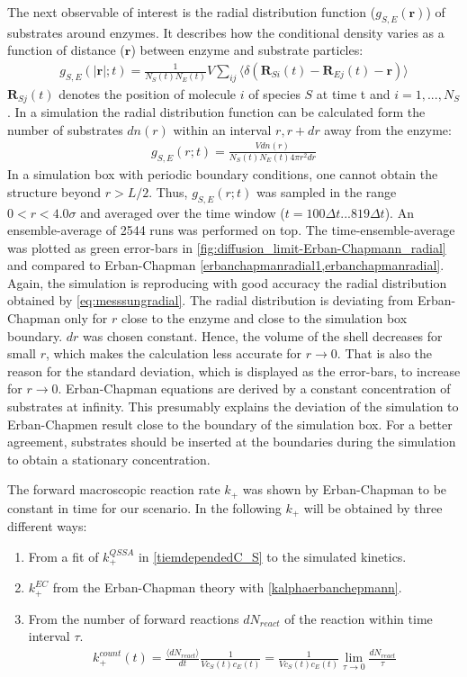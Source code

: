 \documentclass[
  a4paper,BCOR10mm,twoside,
  headsepline,footsepline,%
  fleqn,openbib
]{scrbook}
\begin{document}
The next observable of interest is the radial distribution function ($g_{S,E}(\bm{r})$) of substrates around enzymes. It describes how the conditional density varies as a function of distance ($\bm{r}$) between enzyme and substrate particles:  
\begin{align}
 g_{S,E}(|\bm{r}|;t)=\frac{1}{ N_S (t) N_E(t)} V \sum_{ij} \langle \delta(\bm{R}_{S i}(t)-\bm{R}_{E j}(t)-\bm{r})\rangle
\end{align}
 $\bm{R}_{S j}(t)$ denotes the position of molecule $i$ of species $S$ at time t and $i=1,...,N_{S}$.
In a simulation the radial distribution function can be calculated form the number of substrates $dn(r)$ within an interval $r,r+dr$ away from the enzyme:
\begin{align} 
 g_{S,E}(r;t)=\frac{V dn(r)}{  N_S (t) N_E(t) 4\pi r^2 dr} \label{eq:messsungradial}
\end{align}
In a simulation box with periodic boundary conditions, one cannot obtain the structure beyond $r>L/2$. Thus, $g_{S,E}(r;t)$ was sampled in the range $0 <r<4.0 \sigma$ and averaged over the time window ($t=100 \Delta t ...819 \Delta t$). An ensemble-average of 2544 runs was performed on top. The time-ensemble-average was plotted as green error-bars in \cref{fig:diffusion_limit-Erban-Chapmann_radial} and compared to Erban-Chapman \cref{erbanchapmanradial1,erbanchapmanradial}. Again, the simulation is reproducing with good accuracy the radial distribution obtained by \cref{eq:messsungradial}. The radial distribution is deviating from Erban-Chapman only for $r$ close to the enzyme and close to the simulation box boundary. $dr$ was chosen constant. Hence, the volume of the shell decreases for small $r$, which makes the calculation less accurate for $r\rightarrow 0$. That is also the reason for the standard deviation, which is displayed as the error-bars, to increase for $r\rightarrow 0$.  Erban-Chapman equations are derived by a constant concentration of substrates at infinity. This presumably explains the deviation of the simulation to Erban-Chapmen result close to the boundary of the simulation box. For a better agreement, substrates should be inserted at the boundaries during the simulation to obtain a stationary concentration. 
\par 
The forward macroscopic reaction rate $k_+$ was shown by Erban-Chapman to be constant in time for our scenario. In the following $k_+$ will be obtained by three different ways:
\begin{enumerate}
 \item From a fit of $k^{QSSA}_+$ in \cref{tiemdependedC_S} to the simulated kinetics.
 \item $k^{EC}_+$ from the Erban-Chapman theory with \cref{kalphaerbanchepmann}.
 \item From the number of forward reactions $dN_{react}$ of the reaction  within time interval $\tau$.  
 \begin{align} \label{reactioncount}
  k^{count}_+(t)=\frac{ \langle dN_{react}\rangle}{dt}\frac{1}{V c_S(t) c_E(t)}= \frac{1}{V c_S(t) c_E(t)} \lim_{\tau \to 0} \frac{dN_{react}}{\tau}
 \end{align}
\end{enumerate}
\end{document}
